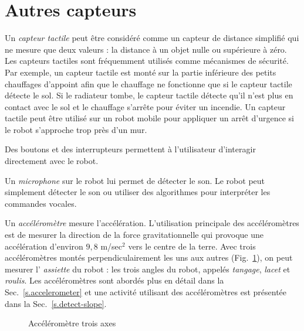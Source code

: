 \section{Autres capteurs}\label{s.other-sensors}

Un \emph{capteur tactile} peut être considéré comme un capteur de distance simplifié qui ne mesure que deux valeurs : la distance à un objet nulle ou supérieure à zéro. Les capteurs tactiles sont fréquemment utilisés comme mécanismes de sécurité. Par exemple, un capteur tactile est monté sur la partie inférieure des petits chauffages d'appoint afin que le chauffage ne fonctionne que si le capteur tactile détecte le sol. Si le radiateur tombe, le capteur tactile détecte qu'il n'est plus en contact avec le sol et le chauffage s'arrête pour éviter un incendie. Un capteur tactile peut être utilisé sur un robot mobile pour appliquer un arrêt d'urgence si le robot s'approche trop près d'un mur.

Des boutons et des interrupteurs permettent à l'utilisateur d'interagir directement avec le robot.

Un \emph{microphone} sur le robot lui permet de détecter le son. Le robot peut simplement détecter le son ou utiliser des algorithmes pour interpréter les commandes vocales.

Un \emph{accéléromètre} mesure l'accélération. L'utilisation principale des accéléromètres est de mesurer la direction de la force gravitationnelle qui provoque une accélération d'environ $9,8$ m/sec$^{2}$ vers le centre de la terre. Avec trois accéléromètres montés perpendiculairement les uns aux autres (Fig.~\ref{fig.accel}), on peut mesurer l' \emph{assiette} du robot : les trois angles du robot, appelés \emph{tangage}, \emph{lacet} et \emph{roulis}. Les accéléromètres sont abordés plus en détail dans la Sec.~\ref{s.accelerometer} et une activité utilisant des accéléromètres est présentée dans la Sec.~\ref{s.detect-slope}.

\begin{figure}
\begin{center}
\caption{Accéléromètre trois axes}\label{fig.accel}
\end{center}
\end{figure}

